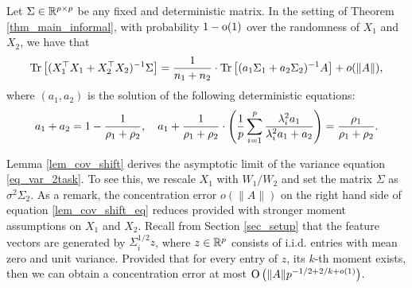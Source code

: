 \begin{lemma}\label{lem_cov_shift}
	Let $\Sigma \in \mathbb{R}^{p \times p}$ be any fixed and deterministic matrix.
	In the setting of Theorem \ref{thm_main_informal},
	with probability $1-\operatorname{o}(1)$ over the randomness of $X_1$ and $X_2$, we have that %
	\begin{align}\label{lem_cov_shift_eq}
		\bigtr{(X_1^{\top}X_1 + X_2^{\top}X_2)^{-1} \Sigma} = \frac{1}{n_1 + n_2}\cdot \bigtr{ (a_1 \Sigma_1 + a_2\Sigma_2)^{-1} A} + o(\norm{A}), %
	\end{align}
	where $(a_1, a_2)$ is the solution of the following deterministic equations:
	\begin{align}
		a_1 + a_2 = 1- \frac{1}{\rho_1 + \rho_2},\quad a_1 + \frac1{\rho_1 + \rho_2}\cdot \left({\frac{1}{p}\sum_{i=1}^p \frac{\lambda_i^2 a_1}{\lambda_i^2 a_1 + a_2}}\right) = \frac{\rho_1}{\rho_1 + \rho_2}. \label{eq_a12extra}
	\end{align}
\end{lemma}

Lemma \ref{lem_cov_shift} derives the asymptotic limit of the variance equation \eqref{eq_var_2task}.
To see this, we rescale $X_1$ with $W_1 / W_2$ and set the matrix $\Sigma$ as $\sigma^2 \Sigma_2$.
As a remark, the concentration error $o(\|A\|)$ on the right hand side of equation \eqref{lem_cov_shift_eq} reduces provided with stronger moment assumptions on $X_1$ and $X_2$. %
Recall from Section \ref{sec_setup} that the feature vectors are generated by $\Sigma_i^{1/2} z$, where $z\in\mathbb{R}^p$ consists of i.i.d. entries with mean zero and unit variance.
Provided that for every entry of $z$, its $k$-th moment exists, then we can obtain a concentration error at most $\operatorname{O}\left(\|A\| p^{-1/2 + 2/k + o(1)}\right)$.

